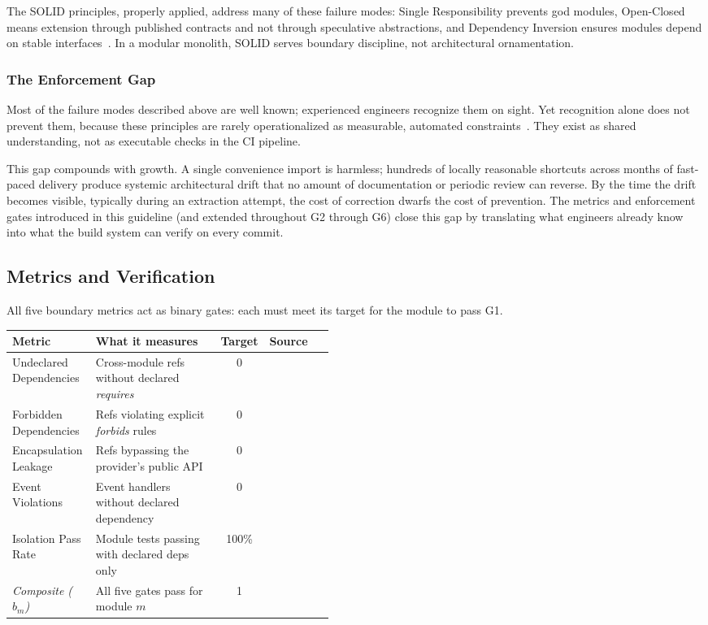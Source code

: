 \noindent
The SOLID principles, properly applied, address many of these failure modes: Single Responsibility prevents god modules, Open-Closed means extension through published contracts and not through speculative abstractions, and Dependency Inversion ensures modules depend on stable interfaces~\cite{martin2012clean}. In a modular monolith, SOLID serves boundary discipline, not architectural ornamentation.

\subsubsection*{The Enforcement Gap}

\noindent
Most of the failure modes described above are well known; experienced engineers recognize them on sight. Yet recognition alone does not prevent them, because these principles are rarely operationalized as measurable, automated constraints~\cite{fairbanks2010justenough}. They exist as shared understanding, not as executable checks in the CI pipeline.

This gap compounds with growth. A single convenience import is harmless; hundreds of locally reasonable shortcuts across months of fast-paced delivery produce systemic architectural drift that no amount of documentation or periodic review can reverse. By the time the drift becomes visible, typically during an extraction attempt, the cost of correction dwarfs the cost of prevention. The metrics and enforcement gates introduced in this guideline (and extended throughout G2 through G6) close this gap by translating what engineers already know into what the build system can verify on every commit.

\subsection*{Metrics and Verification}

All five boundary metrics act as binary gates: each must meet its target for the module to pass G1.

\medskip
\noindent
\small
\begin{tabularx}{\linewidth}{p{0.26\linewidth} X c p{0.20\linewidth}}
\toprule
\textbf{Metric} & \textbf{What it measures} & \textbf{Target} & \textbf{Source} \\
\midrule
Undeclared Dependencies & Cross-module refs without declared \emph{requires} & 0 & \cite{deLauretis2019from} \\
Forbidden Dependencies & Refs violating explicit \emph{forbids} rules & 0 & \cite{martin2012clean} \\
Encapsulation Leakage & Refs bypassing the provider's public API & 0 & \cite{parnas1972informationhiding} \\
Event Violations & Event handlers without declared dependency & 0 & \cite{richardson2018microservices} \\
Isolation Pass Rate & Module tests passing with declared deps only & 100\% & \cite{fairbanks2010justenough} \\
\midrule
\emph{Composite ($b_m$)} & All five gates pass for module $m$ & 1 & \cite{FordParsons2017} \\
\bottomrule
\end{tabularx}
\normalsize

